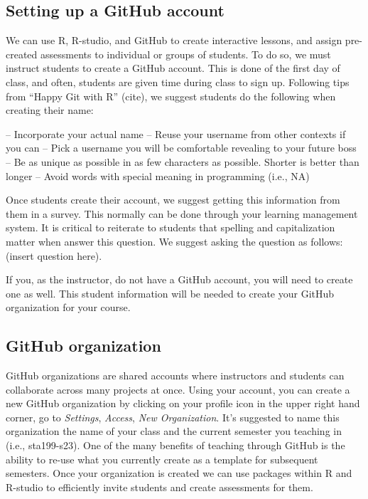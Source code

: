 \documentclass[
  12pt]{article}
\begin{document}
\hypertarget{setting-up-a-github-account}{%
\subsection{Setting up a GitHub
account}\label{setting-up-a-github-account}}

We can use R, R-studio, and GitHub to create interactive lessons, and
assign pre-created assessments to individual or groups of students. To
do so, we must instruct students to create a GitHub account. This is
done of the first day of class, and often, students are given time
during class to sign up. Following tips from ``Happy Git with R''
(cite), we suggest students do the following when creating their name:

-- Incorporate your actual name -- Reuse your username from other
contexts if you can -- Pick a username you will be comfortable revealing
to your future boss -- Be as unique as possible in as few characters as
possible. Shorter is better than longer -- Avoid words with special
meaning in programming (i.e., NA)

Once students create their account, we suggest getting this information
from them in a survey. This normally can be done through your learning
management system. It is critical to reiterate to students that spelling
and capitalization matter when answer this question. We suggest asking
the question as follows: (insert question here).

If you, as the instructor, do not have a GitHub account, you will need
to create one as well. This student information will be needed to create
your GitHub organization for your course.

\hypertarget{github-organization}{%
\subsection{GitHub organization}\label{github-organization}}

GitHub organizations are shared accounts where instructors and students
can collaborate across many projects at once. Using your account, you
can create a new GitHub organization by clicking on your profile icon in
the upper right hand corner, go to \emph{Settings}, \emph{Access},
\emph{New Organization}. It's suggested to name this organization the
name of your class and the current semester you teaching in (i.e.,
sta199-s23). One of the many benefits of teaching through GitHub is the
ability to re-use what you currently create as a template for subsequent
semesters. Once your organization is created we can use packages within
R and R-studio to efficiently invite students and create assessments for
them.
\end{document}
